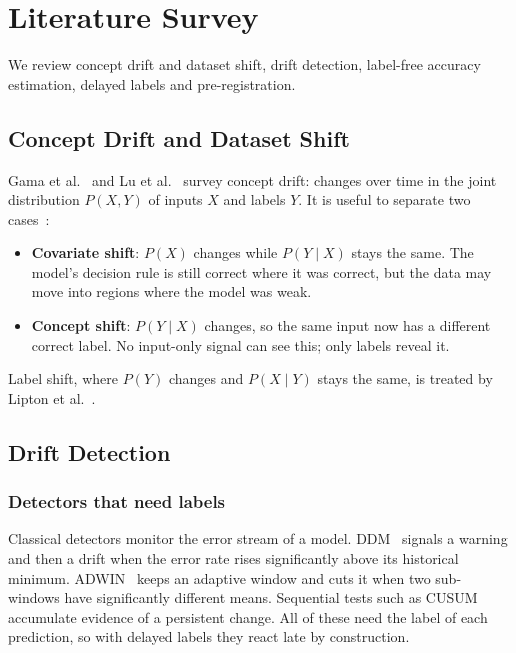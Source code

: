 
\chapter{Literature Survey}
\label{ch:lit}

We review concept drift and dataset shift, drift detection, label-free accuracy estimation, delayed labels and pre-registration.

\section{Concept Drift and Dataset Shift}
Gama et al.~\cite{gama2014survey} and Lu et al.~\cite{lu2019review} survey concept drift: changes over time in the joint distribution $P(X, Y)$ of inputs $X$ and labels $Y$. It is useful to separate two cases~\cite{quinonero2009shift}:
\begin{itemize}
\item \textbf{Covariate shift}: $P(X)$ changes while $P(Y\mid X)$ stays the same. The model's decision rule is still correct where it was correct, but the data may move into regions where the model was weak.
\item \textbf{Concept shift}: $P(Y\mid X)$ changes, so the same input now has a different correct label. No input-only signal can see this; only labels reveal it.
\end{itemize}
Label shift, where $P(Y)$ changes and $P(X\mid Y)$ stays the same, is treated by Lipton et al.~\cite{lipton2018labelshift}.

\section{Drift Detection}
\subsection{Detectors that need labels}
Classical detectors monitor the error stream of a model. DDM~\cite{gama2004ddm} signals a warning and then a drift when the error rate rises significantly above its historical minimum. ADWIN~\cite{bifet2007adwin} keeps an adaptive window and cuts it when two sub-windows have significantly different means. Sequential tests such as CUSUM~\cite{page1954cusum} accumulate evidence of a persistent change. All of these need the label of each prediction, so with delayed labels they react late by construction.

